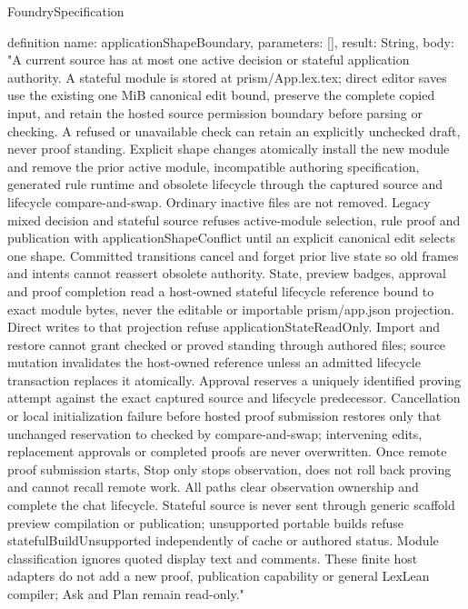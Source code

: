 \begin{lexlean}{FoundrySpecification}
\begin{semanticmodule}
definition{
  name: applicationShapeBoundary,
  parameters: [],
  result: String,
  body: "A current source has at most one active decision or stateful application authority. A stateful module is stored at prism/App.lex.tex; direct editor saves use the existing one MiB canonical edit bound, preserve the complete copied input, and retain the hosted source permission boundary before parsing or checking. A refused or unavailable check can retain an explicitly unchecked draft, never proof standing. Explicit shape changes atomically install the new module and remove the prior active module, incompatible authoring specification, generated rule runtime and obsolete lifecycle through the captured source and lifecycle compare-and-swap. Ordinary inactive files are not removed. Legacy mixed decision and stateful source refuses active-module selection, rule proof and publication with applicationShapeConflict until an explicit canonical edit selects one shape. Committed transitions cancel and forget prior live state so old frames and intents cannot reassert obsolete authority. State, preview badges, approval and proof completion read a host-owned stateful lifecycle reference bound to exact module bytes, never the editable or importable prism/app.json projection. Direct writes to that projection refuse applicationStateReadOnly. Import and restore cannot grant checked or proved standing through authored files; source mutation invalidates the host-owned reference unless an admitted lifecycle transaction replaces it atomically. Approval reserves a uniquely identified proving attempt against the exact captured source and lifecycle predecessor. Cancellation or local initialization failure before hosted proof submission restores only that unchanged reservation to checked by compare-and-swap; intervening edits, replacement approvals or completed proofs are never overwritten. Once remote proof submission starts, Stop only stops observation, does not roll back proving and cannot recall remote work. All paths clear observation ownership and complete the chat lifecycle. Stateful source is never sent through generic scaffold preview compilation or publication; unsupported portable builds refuse statefulBuildUnsupported independently of cache or authored status. Module classification ignores quoted display text and comments. These finite host adapters do not add a new proof, publication capability or general LexLean compiler; Ask and Plan remain read-only."
}


\end{semanticmodule}
\end{lexlean}
